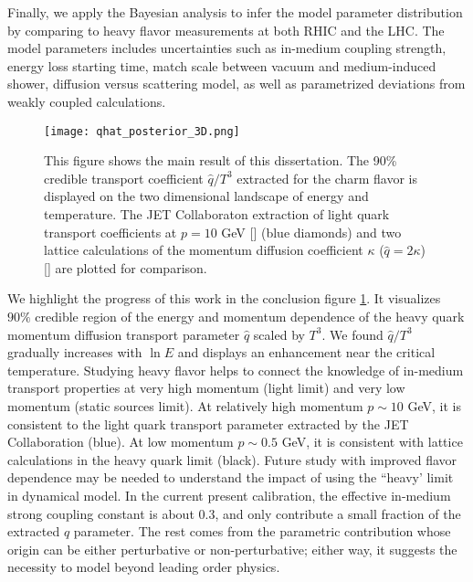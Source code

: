 Finally, we apply the Bayesian analysis to infer the model parameter distribution by comparing to heavy flavor measurements at both RHIC and the LHC.
The model parameters includes uncertainties such as in-medium coupling strength, energy loss starting time, match scale between vacuum and medium-induced shower, diffusion versus scattering model, as well as parametrized deviations from weakly coupled calculations.

\begin{figure}
\centering
\texttt{[image: qhat\_posterior\_3D.png]}
\caption{This figure shows the main result of this dissertation. The 90\% credible transport coefficient $\hat{q}/T^3$ extracted for the charm flavor is displayed on the two dimensional landscape of energy and temperature. The JET Collaboraton extraction of light quark transport coefficients at $p=10$ GeV [] (blue diamonds) and two lattice calculations of the momentum diffusion coefficient $\kappa$ ($\hat{q}=2\kappa$) [] are plotted for comparison.}
\label{fig:conlusion}
\end{figure}

We highlight the progress of this work in the conclusion figure \ref{fig:conlusion}.
It visualizes $90\%$ credible region of the energy and momentum dependence of the heavy quark momentum diffusion transport parameter $\hat{q}$ scaled by $T^3$.
We found $\hat{q}/T^3$ gradually increases with $\ln E$ and displays an enhancement near the critical temperature.
Studying heavy flavor helps to connect the knowledge of in-medium transport properties at very high momentum (light limit) and very low momentum (static sources limit).
At relatively high momentum $p\sim 10$ GeV, it is consistent to the light quark transport parameter extracted by the JET Collaboration (blue).
At low momentum $p\sim 0.5$ GeV, it is consistent with lattice calculations in the heavy quark limit (black).
Future study with improved flavor dependence may be needed to understand the impact of using the ``heavy' limit in dynamical model.
In the current present calibration, the effective in-medium strong coupling constant is about $0.3$, and only contribute a small fraction of the extracted $\hat{q}$ parameter.
The rest comes from the parametric contribution whose origin can be either perturbative or non-perturbative; either way, it suggests the necessity to model beyond leading order physics.

